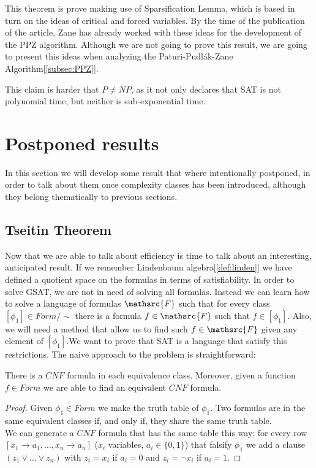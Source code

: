 This theorem is prove making use of Sparsification Lemma, which is based in turn on the ideas of critical and forced variables. By the time of the publication of the article, Zane has already worked with these ideas for the development of the PPZ algorithm\cite{paturi1997satisfiability}. Although we are not going to prove this result, we are going to present this ideas when analyzing the Paturi-Pudlák-Zane Algorithm[\ref{subsec:PPZ}].
 
This claim is harder that $P\ne NP$, as it not only declares that SAT is not polynomial time, but neither is sub-exponential time. 

\section{Postponed results}
In this section we will develop some result that where intentionally postponed, in order to talk about them once complexity classes has been introduced, although they belong thematically to previous sections. 
\subsection{Tseitin Theorem}
Now that we are able to talk about efficiency is time to talk about an interesting, anticipated result. If we remember Lindenbaum algebra[\ref{def:linden}] we have defined a quotient space on the formulas in terms of satisfiability. In order to solve GSAT, we are not in need of solving all formulas.  Instead we can learn how to solve a language of formulas $\mathsrc{F}$ such that for every class $[\phi_1]\in Form/\sim$ there  is a formula $f\in\mathsrc{F}$ such that $f \in [\phi_1]$. Also, we will need a method that allow us to find such $f\in\mathsrc{F}$ given any element of $[\phi_1]$.We want to prove that SAT is a language that satisfy this restrictions. The naive approach to the problem is straightforward:\\

\begin{proposition}
  There is a $CNF$ formula in each equivalence class. Moreover, given a function $f\in Form$ we are able to find an equivalent $CNF$ formula.
\end{proposition}
\begin{proof}
 Given $\phi_1 \in Form$ we make the truth table of $\phi_1$. Two formulas are in the same equivalent classes if, and only if, they share the same truth table. \\

  We can generate a $CNF$ formula that has the same table this way: for every row $[x_1\to a_1,...,x_n\to a_n]$ ($x_i$ variables, $a_i\in \{0,1\}$) that falsify $\phi_1$ we add a clause $(z_1\vee ... \vee z_n)$ with $z_i = x_i$ if $a_i = 0$ and  $z_i =\neg x_i$ if $a_i = 1$.
\end{proof}


